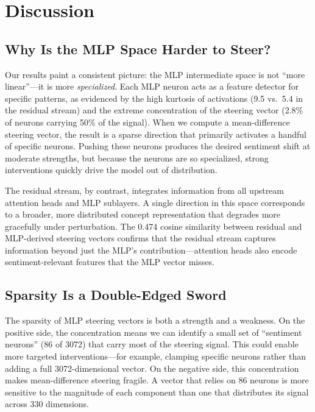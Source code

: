 \section{Discussion}
\label{sec:discussion}

\subsection{Why Is the MLP Space Harder to Steer?}

Our results paint a consistent picture: the MLP intermediate space is not ``more linear''---it is more \emph{specialized}. Each MLP neuron acts as a feature detector for specific patterns, as evidenced by the high kurtosis of activations (9.5 vs.\ 5.4 in the residual stream) and the extreme concentration of the steering vector (2.8\% of neurons carrying 50\% of the signal). When we compute a mean-difference steering vector, the result is a sparse direction that primarily activates a handful of specific neurons. Pushing these neurons produces the desired sentiment shift at moderate strengths, but because the neurons are so specialized, strong interventions quickly drive the model out of distribution.

The residual stream, by contrast, integrates information from all upstream attention heads and MLP sublayers. A single direction in this space corresponds to a broader, more distributed concept representation that degrades more gracefully under perturbation. The 0.474 cosine similarity between residual and MLP-derived steering vectors confirms that the residual stream captures information beyond just the MLP's contribution---attention heads also encode sentiment-relevant features that the MLP vector misses.

\subsection{Sparsity Is a Double-Edged Sword}

The sparsity of MLP steering vectors is both a strength and a weakness. On the positive side, the concentration means we can identify a small set of ``sentiment neurons'' (86 of 3072) that carry most of the steering signal. This could enable more targeted interventions---for example, clamping specific neurons rather than adding a full 3072-dimensional vector. On the negative side, this concentration makes mean-difference steering fragile. A vector that relies on 86 neurons is more sensitive to the magnitude of each component than one that distributes its signal across 330 dimensions.

